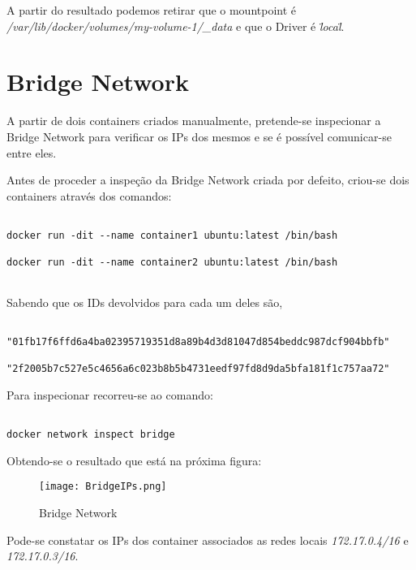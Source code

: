 A partir do resultado podemos retirar que o mountpoint é \emph{ /var/lib/docker/volumes/my-volume-1/\_data }
e que o Driver é \emph{\"local\"}.

\section{Bridge Network}

A partir de dois containers criados manualmente, pretende-se inspecionar a Bridge Network para verificar os IPs dos mesmos e se é possível comunicar-se entre eles. 

Antes de proceder a inspeção da Bridge Network criada por defeito, criou-se dois containers através dos comandos:

\begin{lstlisting}

docker run -dit --name container1 ubuntu:latest /bin/bash

docker run -dit --name container2 ubuntu:latest /bin/bash
	
\end{lstlisting}

Sabendo que os IDs devolvidos para cada um deles são, 
\begin{lstlisting}

"01fb17f6ffd6a4ba02395719351d8a89b4d3d81047d854beddc987dcf904bbfb"

"2f2005b7c527e5c4656a6c023b8b5b4731eedf97fd8d9da5bfa181f1c757aa72"

\end{lstlisting}
Para inspecionar recorreu-se ao comando:

\begin{lstlisting}

docker network inspect bridge

\end{lstlisting} 

Obtendo-se o resultado que está na próxima figura:

\begin{figure}[H]

	\centering

 	\texttt{[image: BridgeIPs.png]}

 	\caption {Bridge Network}

  	\label {fig:Brid}
\end{figure}

Pode-se constatar os IPs dos container associados as redes locais \emph{172.17.0.4/16} e \emph{172.17.0.3/16}.

